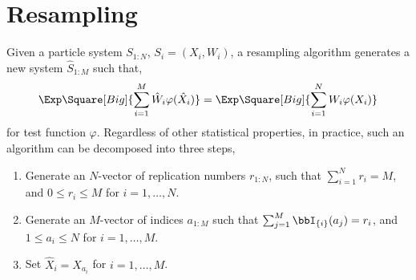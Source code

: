 %
%
%
%

\chapter{Resampling}
\label{chap:Resampling}

Given a particle system $S_{1:N}$, $S_i = (X_i,W_i)$, a resampling algorithm
generates a new system $\hat{S}_{1:M}$ such that,
\begin{equation*}
  \Exp\Square[Big]{\sum_{i=1}^M{\hat{W}_i\varphi(\hat{X}_i)}} =
  \Exp\Square[Big]{\sum_{i=1}^N{W_i\varphi(X_i)}}
\end{equation*}
for test function $\varphi$. Regardless of other statistical properties, in
practice, such an algorithm can be decomposed into three steps,

\begin{enumerate}
  \item Generate an $N$-vector of replication numbers $r_{1:N}$, such that
    $\sum_{i=1}^N r_i = M$, and $0 \le r_i \le M$ for $i=1,\dots,N$.
  \item Generate an $M$-vector of indices $a_{1:M}$ such that $\sum_{j=1}^M
    \bbI_{\{i\}}(a_j) = r_i$, and $1 \le a_i \le N$ for $i = 1,\dots,M$.
  \item Set $\hat{X}_i = X_{a_i}$ for $i = 1,\dots,M$.
\end{enumerate}

